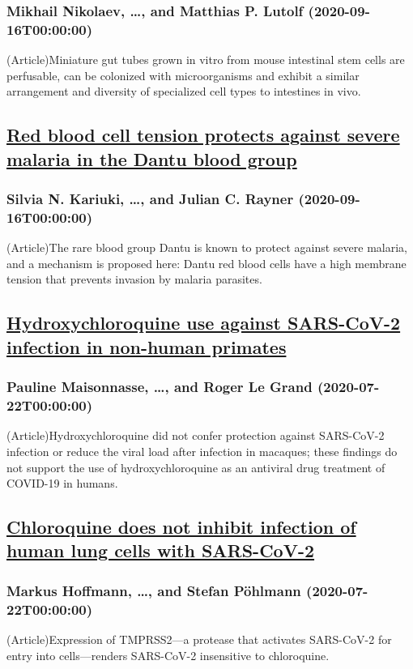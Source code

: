 \subsubsection*{Mikhail Nikolaev, \dots, and Matthias P. Lutolf (2020-09-16T00:00:00)}
(Article)Miniature gut tubes grown in vitro from mouse intestinal stem cells are perfusable, can be colonized with microorganisms and exhibit a similar arrangement and diversity of specialized cell types to intestines in vivo.
\subsection*{\href{https://www.nature.com/articles/s41586-020-2726-6}{Red blood cell tension protects against severe malaria in the Dantu blood group}}
\subsubsection*{Silvia N. Kariuki, \dots, and Julian C. Rayner (2020-09-16T00:00:00)}
(Article)The rare blood group Dantu is known to protect against severe malaria, and a mechanism is proposed here: Dantu red blood cells have a high membrane tension that prevents invasion by malaria parasites.
\subsection*{\href{https://www.nature.com/articles/s41586-020-2558-4}{Hydroxychloroquine use against SARS-CoV-2 infection in non-human primates}}
\subsubsection*{Pauline Maisonnasse, \dots, and Roger Le Grand (2020-07-22T00:00:00)}
(Article)Hydroxychloroquine did not confer protection against SARS-CoV-2 infection or reduce the viral load after infection in macaques; these findings do not support the use of hydroxychloroquine as an antiviral drug treatment of COVID-19 in humans.
\subsection*{\href{https://www.nature.com/articles/s41586-020-2575-3}{Chloroquine does not inhibit infection of human lung cells with SARS-CoV-2}}
\subsubsection*{Markus Hoffmann, \dots, and Stefan Pöhlmann (2020-07-22T00:00:00)}
(Article)Expression of TMPRSS2—a protease that activates SARS-CoV-2 for entry into cells—renders SARS-CoV-2 insensitive to chloroquine.
